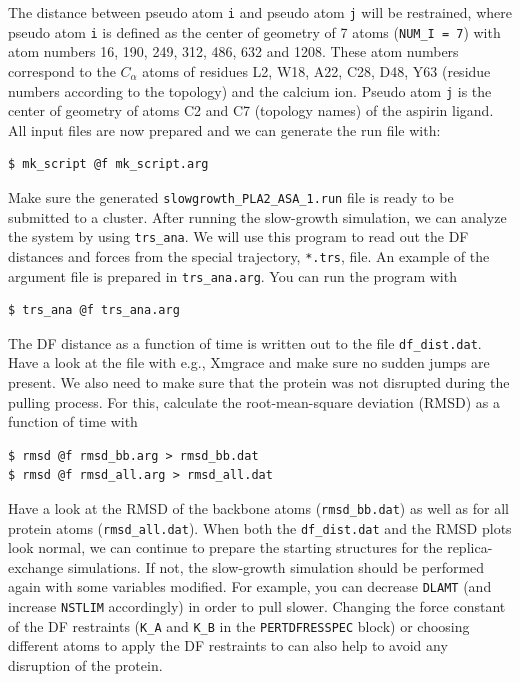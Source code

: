 The distance between pseudo atom \texttt{i} and pseudo atom \texttt{j} will be restrained, where pseudo atom \texttt{i} is defined as the center of geometry of 7 atoms (\texttt{NUM\_I = 7}) with atom numbers 16, 190, 249, 312, 486, 632 and 1208. 
These atom numbers correspond to the $C_{\alpha}$ atoms of residues L2, W18, A22, C28, D48, Y63 (residue numbers according to the topology) and the calcium ion. 
Pseudo atom \texttt{j} is the center of geometry of atoms C2 and C7 (topology names) of the aspirin ligand. 
All input files are now prepared and we can generate the run file with:
\begin{lstlisting}
$ mk_script @f mk_script.arg
\end{lstlisting}
Make sure the generated \texttt{slowgrowth\_PLA2\_ASA\_1.run} file is ready to be submitted to a cluster. 
After running the slow-growth simulation, we can analyze the system by using \texttt{trs\_ana}. 
We will use this program to read out the DF distances and forces from the special trajectory, \texttt{*.trs}, file. An example of the argument file is prepared in \texttt{trs\_ana.arg}. 
You can run the program with 
\begin{lstlisting}
$ trs_ana @f trs_ana.arg
\end{lstlisting}
The DF distance as a function of time is written out to the file \texttt{df\_dist.dat}. Have a look at the file with e.g., Xmgrace and make sure no sudden jumps are present. 
We also need to make sure that the protein was not disrupted during the pulling process. For this, calculate the root-mean-square deviation (RMSD) as a function of time with
\begin{lstlisting}
$ rmsd @f rmsd_bb.arg > rmsd_bb.dat
$ rmsd @f rmsd_all.arg > rmsd_all.dat
\end{lstlisting}
Have a look at the RMSD of the backbone atoms (\texttt{rmsd\_bb.dat}) as well as for all protein atoms (\texttt{rmsd\_all.dat}). 
When both the \texttt{df\_dist.dat} and the RMSD plots look normal, we can continue to prepare the starting structures for the replica-exchange simulations. 
If not, the slow-growth simulation should be performed again with some variables modified.
For example, you can decrease \texttt{DLAMT} (and increase \texttt{NSTLIM} accordingly) in order to pull slower. 
Changing the force constant of the DF restraints (\texttt{K\_A} and \texttt{K\_B} in the \texttt{PERTDFRESSPEC} block) or choosing different atoms to apply the DF restraints to can also help to avoid any disruption of the protein.

